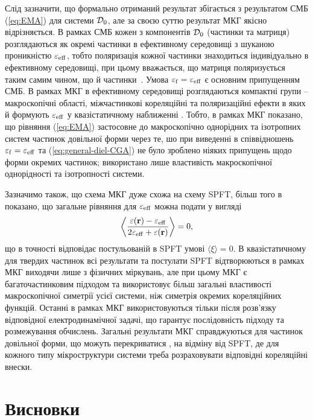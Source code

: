 \documentclass[14pt,twoside]{vakthesis}
\begin{document}
Слід зазначити, що формально отриманий результат збігається з результатом СМБ (\ref{eq:EMA}) для системи ${\cal D}_0$, але за своєю суттю результат МКГ якісно відрізняється. В рамках СМБ кожен з компонентів ${\cal D}_0$ (частинки та матриця) розглядаються як окремі частинки в ефективному середовищі з шуканою проникністю $\varepsilon_{\rm eff}$, тобто поляризація кожної частинки знаходиться індивідуально в ефективному середовищі, при цьому вважається, що матриця поляризується таким самим чином, що й частинки~\cite{Banheg1986}. Умова $\varepsilon_{\rm f} = \varepsilon_{\rm eff}$ є основним припущенням  СМБ. В рамках МКГ в ефективному середовищі розглядаються компактні групи -- макроскопічні області, міжчастинкові кореляційні та поляризаційні ефекти в яких й формують $\varepsilon_{\rm eff}$ у квазістатичному наближенні \cite{Sushko2017}. Тобто, в рамках МКГ показано, що рівняння (\ref{eq:EMA}) застосовне до макроскопічно однорідних та ізотропних систем частинок довільної форми через те, шо при виведенні в \cite{Sushko2017} співвідношень $\varepsilon_{\rm f} = \varepsilon_{\rm eff}$ та (\ref{eq:general-diel-CGA}) не було зроблено ніяких припущень щодо форми окремих частинок; використано лише властивість макроскопічної однорідності та ізотропності системи.

Зазначимо також, що схема МКГ дуже схожа на схему SPFT, більш того в \cite{Sushko2017} показано, що загальне рівняння для $\varepsilon_{\rm eff}$ можна подати у  вигляді
\begin{equation}\label{eq:general-CGA-origin-short}
\left\langle \frac{\varepsilon({\bf r}) - \varepsilon_{\rm eff}}{2\varepsilon_{\rm eff} + \varepsilon({\bf r})} \right\rangle = 0,
\end{equation}
що в точності відповідає постульованій в SPFT умові $\langle \xi \rangle = 0$.  
В квазістатичному для твердих частинок всі результати та постулати SPFT відтворюються в рамках МКГ виходячи лише з фізичних міркувань, але при цьому МКГ є багаточастинковим підходом та використовує більш загальні властивості макроскопічної симетрії усієї системи, ніж симетрія окремих кореляційних функцій.
Останні в рамках МКГ використовуються тільки після розв'язку відповідної електродинамічної задачі, що гарантує послідовність підходу та розмежування обчислень.
Загальні результати МКГ  справджуються для частинок довільної форми, що можуть перекриватися \cite{Sushko2018EPJ}, на відміну від SPFT, де для кожного типу мікроструктури системи треба розраховувати відповідні кореляційні внески.

\section{Висновки}
\end{document}
